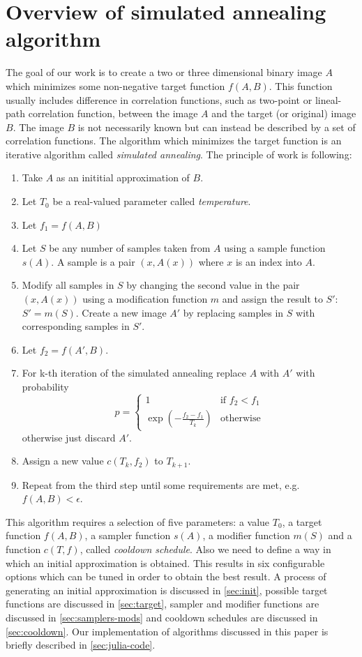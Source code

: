 \documentclass[preprint,amsmath,amssymb,aps,pre,nofootinbib]{revtex4-1}
\begin{document}
\section{Overview of simulated annealing algorithm}
\label{sec:annealing}
The goal of our work is to create a two or three dimensional binary image $A$
which minimizes some non-negative target function $f(A, B)$. This function
usually includes difference in correlation functions, such as two-point or
lineal-path correlation function, between the image $A$ and the target (or
original) image $B$. The image $B$ is not necessarily known but can instead be
described by a set of correlation functions. The algorithm which minimizes the
target function is an iterative algorithm called \textit{simulated
  annealing}. The principle of work is following:
\begin{enumerate}
\item Take $A$ as an inititial approximation of $B$.
\item Let $T_0$ be a real-valued parameter called \textit{temperature}.
\item Let $f_1 = f(A, B)$
\item Let $S$ be any number of samples taken from $A$ using a sample function
  $s(A)$. A sample is a pair $(x, A(x))$ where $x$ is an index into $A$.
\item Modify all samples in $S$ by changing the second value in the pair
  $(x, A(x))$ using a modification function $m$ and assign the result to $S'$:
  $S' = m(S)$. Create a new image $A'$ by replacing samples in $S$ with
  corresponding samples in $S'$.
\item Let $f_2 = f(A', B)$.
\item For k-th iteration of the simulated annealing replace $A$ with $A'$ with
  probability
  \begin{equation*}
    p =
    \begin{cases}
      1 & \text{if } f_2 < f_1 \\
      \exp(-\frac{f_2 - f_1}{T_k}) & \text{otherwise}
    \end{cases}
  \end{equation*}
  otherwise just discard $A'$.
\item Assign a new value $c(T_k, f_2)$ to $T_{k+1}$.
\item Repeat from the third step until some requirements are met, e.g.
  $f(A, B) < \epsilon$.
\end{enumerate}
This algorithm requires a selection of five parameters: a value $T_0$, a target
function $f(A, B)$, a sampler function $s(A)$, a modifier function $m(S)$ and a
function $c(T, f)$, called \textit{cooldown schedule}. Also we need to define a
way in which an initial approximation is obtained. This results in six
configurable options which can be tuned in order to obtain the best result. A
process of generating an initial approximation is discussed in \cref{sec:init},
possible target functions are discussed in \cref{sec:target}, sampler and
modifier functions are discussed in \cref{sec:samplers-mods} and cooldown
schedules are discussed in \cref{sec:cooldown}. Our implementation of algorithms
discussed in this paper is briefly described in \cref{sec:julia-code}.
\end{document}
